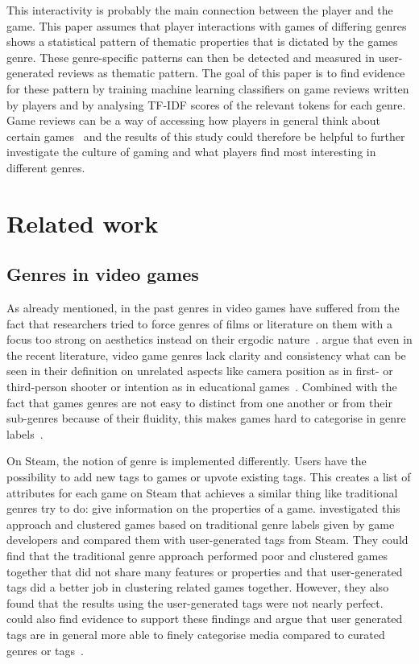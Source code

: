 \documentclass[11pt, a4paper]{article}
\begin{document}
This interactivity is probably the main connection between the player and the game.
This paper assumes that player interactions with games of differing genres shows a statistical pattern of thematic
properties that is dictated by the games genre.
These genre-specific patterns can then be detected and measured in user-generated reviews as thematic pattern.
The goal of this paper is to find evidence for these pattern by training machine learning classifiers on game
reviews written by players and by analysing TF-IDF scores of the relevant tokens for each genre.
Game reviews can be a way of accessing how players in general think about certain games~\cite[358]{Zagal2011} and the
results of this study could therefore be helpful to further investigate the culture of gaming and what players find most
interesting in different genres.


\section{Related work}\label{sec:related-work}
\subsection{Genres in video games}\label{subsec:genres-in-video-games}
As already mentioned, in the past genres in video games have suffered from the fact that researchers tried to force
genres of films or literature on them with a focus too strong on aesthetics instead on their ergodic nature~\parencite[7]{Apperley2006}.
\cite{Heintz2015} argue that even in the recent literature, video game genres lack clarity and consistency what can
be seen in their definition on unrelated aspects like camera position as in first- or third-person shooter or intention
as in educational games~\parencite[176-177]{Heintz2015}.
Combined with the fact that games genres are not easy to distinct from one another or from their sub-genres because
of their fluidity, this makes games hard to categorise in genre labels~\parencites[177]{Heintz2015}[23]{Atkins2003}.

On Steam, the notion of genre is implemented differently.
Users have the possibility to add new tags to games or upvote existing tags.
This creates a list of attributes for each game on Steam that achieves a similar thing like traditional genres try to do:
give information on the properties of a game.
\cite{Simonson2023} investigated this approach and clustered games based on traditional genre labels given by game
developers and compared them with user-generated tags from Steam.
They could find that the traditional genre approach performed poor and clustered games together that did not share many features or
properties and that user-generated tags did a better job in clustering related games together.
However, they also found that the results using the user-generated tags were not nearly perfect.
\cite{Windleharth2016} could also find evidence to support these findings and argue that user generated tags are in
general more able to finely categorise media compared to curated genres or tags~\parencite[421]{Windleharth2016}.
\end{document}
